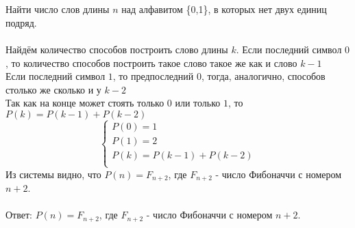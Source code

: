 \documentclass{article}
\begin{document}
\section{}
Найти число слов длины $n$ над алфавитом \{0,1\}, в которых нет двух единиц подряд.\\
\\
Найдём количество способов построить слово длины $k$.
Если последний символ $0$, то количество способов построить такое слово такое же как и слово $k-1$\\
Если последний символ $1$, то предпоследний $0$, тогда, аналогично, способов столько же сколько и у $k-2$\\
Так как на конце может стоять только $0$ или только $1$, то \\$P(k)=P(k-1)+P(k-2)$
\\
\begin{equation*}
 \begin{cases}
   P(0)=1\\
   P(1)=2\\
   P(k)=P(k-1)+P(k-2)\\
 \end{cases}
\end{equation*}
Из системы видно, что $P(n) = F_{n+2}$, где $F_{n+2}$ - число Фибоначчи с номером $n+2$.\\\\
Ответ: $P(n) = F_{n+2}$, где $F_{n+2}$ - число Фибоначчи с номером $n+2$.
\end{document}
